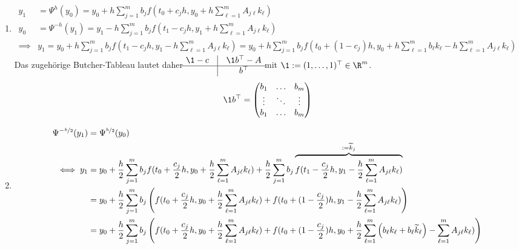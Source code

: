 \begin{solution}
\begin{enumerate}[label = \textbf{\alph*)}]
  \item \begin{align*}
    y_1 &= \Psi^h(y_0) = y_0 + h\sum_{j=1}^mb_jf(t_0+c_jh,y_0+h\sum_{\ell = 1}^m A_{j\ell}k_{\ell}) \\
    y_0 &= \Psi^{-h}(y_1) = y_1 - h\sum_{j=1}^mb_jf(t_1-c_jh,y_1+h\sum_{\ell = 1}^m A_{j\ell}k_{\ell}) \\
    \implies& y_1 = y_0 + h\sum_{j=1}^mb_jf(t_1 - c_jh,y_1-h\sum_{\ell = 1}^m A_{j\ell}k_{\ell})
    = y_0 + h\sum_{j=1}^mb_jf(t_0 + (1-c_j)h,y_0 + h\sum_{\ell=1}^mb_{\ell}k_{\ell} - h\sum_{\ell = 1}^m A_{j\ell}k_{\ell})
  \end{align*}
  Das zugehörige Butcher-Tableau lautet daher
    \renewcommand{\arraystretch}{1.2}
    $\begin{matrix}
    \1 - c& \vline & \1 b^{\top} - A\\
    \hline
     & \vline & b^{\top}
    \end{matrix}$
  mit $\1 := (1,\dots,1)^{\top} \in \R^m$.
  \begin{align*}
    \1 b^{\top} = \begin{pmatrix}
      b_1 & \hdots & b_m \\
      \vdots & \ddots & \vdots \\
      b_1 & \hdots & b_m
    \end{pmatrix}
  \end{align*}
  \item \begin{align*}
    \Psi^{-\nicefrac{h}{2}}(y_1) &= \Psi^{\nicefrac{h}{2}}(y_0) \\
    \iff y_1 &= y_0 + \frac{h}{2}\sum_{j=1}^mb_jf(t_0 + \frac{c_j}{2}h,y_0+\frac{h}{2}\sum_{\ell = 1}^m A_{j\ell}k_{\ell})
    + \frac{h}{2}\sum_{j=1}^mb_j\overbrace{f(t_1 -\frac{c_j}{2}h,y_1-\frac{h}{2}\sum_{\ell = 1}^m A_{j\ell}k_{\ell})}^{:= \widetilde{k}_j} \\
    &= y_0 + \frac{h}{2}\sum_{j=1}^mb_j\left(f(t_0 + \frac{c_j}{2}h, y_0+\frac{h}{2}\sum_{\ell = 1}^m A_{j\ell}k_{\ell})+
    f(t_0 + (1-\frac{c_j}{2})h,y_1 - \frac{h}{2}\sum_{\ell = 1}^m A_{j\ell}k_{\ell})\right) \\
    &= y_0 + \frac{h}{2}\sum_{j=1}^mb_j\left(f(t_0+\frac{c_j}{2}h,y_0+\frac{h}{2}\sum_{\ell = 1}^m A_{j\ell}k_{\ell})+
    f(t_0 + (1-\frac{c_j}{2})h,y_0 +\frac{h}{2}\sum_{\ell=1}^m\left(b_{\ell}k_{\ell}+b_{\ell}\widetilde{k}_{\ell}\right) -
    \sum_{\ell = 1}^m A_{j\ell}k_{\ell})\right)

\end{align*}
\end{enumerate}
\end{solution}
